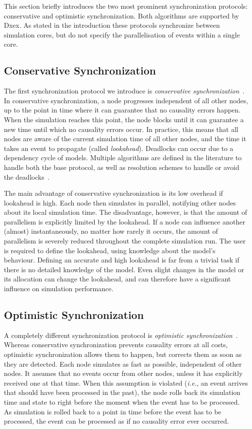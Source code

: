 This section briefly introduces the two most prominent synchronization protocols: conservative and optimistic synchronization.
Both algorithms are supported by Dxex. 
As stated in the introduction these protocols synchronize between simulation cores, but do not specify the parallelisation of events within a single core.

\subsection{Conservative Synchronization}
The first synchronization protocol we introduce is \textit{conservative synchronization}~\cite{FujimotoBook}.
In conservative synchronization, a node progresses independent of all other nodes, up to the point in time where it can guarantee that no causality errors happen.
When the simulation reaches this point, the node blocks until it can guarantee a new time until which no causality errors occur.
In practice, this means that all nodes are aware of the current simulation time of all other nodes, and the time it takes an event to propagate (called \textit{lookahead}).
Deadlocks can occur due to a dependency cycle of models.
Multiple algorithms are defined in the literature to handle both the base protocol, as well as resolution schemes to handle or avoid the deadlocks~\cite{FujimotoBook}.

The main advantage of conservative synchronization is its low overhead if lookahead is high.
Each node then simulates in parallel, notifying other nodes about its local simulation time.
The disadvantage, however, is that the amount of parallelism is explicitly limited by the lookahead.
If a node can influence another (almost) instantaneously, no matter how rarely it occurs, the amount of parallelism is severely reduced throughout the complete simulation run.
The user is required to define the lookahead, using knowledge about the model's behaviour.
Defining an accurate and high lookahead is far from a trivial task if there is no detailed knowledge of the model.
Even slight changes in the model or its allocation can change the lookahead, and can therefore have a significant influence on simulation performance.

\subsection{Optimistic Synchronization}
A completely different synchronization protocol is \textit{optimistic synchronization}~\cite{TimeWarp}.
Whereas conservative synchronization prevents causality errors at all costs, optimistic synchronization allows them to happen, but corrects them as soon as they are detected.
Each node simulates as fast as possible, independent of other nodes.
It assumes that no events occur from other nodes, unless it has explicitly received one at that time.
When this assumption is violated (\textit{i.e.}, an event arrives that should have been processed in the past), the node rolls back its simulation time and state to right before the moment when the event has to be processed.
As simulation is rolled back to a point in time before the event has to be processed, the event can be processed as if no causality error ever occurred.


